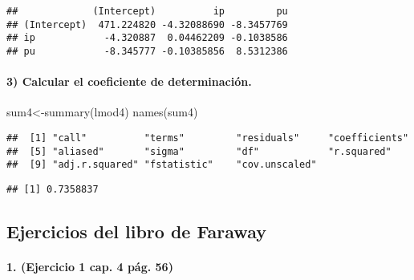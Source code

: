 \documentclass[
]{article}
\newenvironment{Shaded}{\begin{snugshade}}{\end{snugshade}}
\newcommand{\FunctionTok}[1]{\textcolor[rgb]{0.00,0.00,0.00}{#1}}
\newcommand{\NormalTok}[1]{#1}
\newcommand{\OtherTok}[1]{\textcolor[rgb]{0.56,0.35,0.01}{#1}}
\newcommand{\SpecialCharTok}[1]{\textcolor[rgb]{0.00,0.00,0.00}{#1}}
\begin{document}
\begin{verbatim}
##             (Intercept)          ip         pu
## (Intercept)  471.224820 -4.32088690 -8.3457769
## ip            -4.320887  0.04462209 -0.1038586
## pu            -8.345777 -0.10385856  8.5312386
\end{verbatim}

\hypertarget{calcular-el-coeficiente-de-determinaciuxf3n.}{%
\paragraph{3) Calcular el coeficiente de
determinación.}\label{calcular-el-coeficiente-de-determinaciuxf3n.}}

\begin{Shaded}
\begin{Highlighting}[]
\NormalTok{sum4}\OtherTok{\textless{}{-}}\FunctionTok{summary}\NormalTok{(lmod4)}
\FunctionTok{names}\NormalTok{(sum4)}
\end{Highlighting}
\end{Shaded}

\begin{verbatim}
##  [1] "call"          "terms"         "residuals"     "coefficients" 
##  [5] "aliased"       "sigma"         "df"            "r.squared"    
##  [9] "adj.r.squared" "fstatistic"    "cov.unscaled"
\end{verbatim}

\begin{Shaded}
\end{Shaded}

\begin{verbatim}
## [1] 0.7358837
\end{verbatim}

\hypertarget{ejercicios-del-libro-de-faraway}{%
\subsection{Ejercicios del libro de
Faraway}\label{ejercicios-del-libro-de-faraway}}

\hypertarget{ejercicio-1-cap.-4-puxe1g.-56}{%
\paragraph{1. (Ejercicio 1 cap. 4 pág.
56)}\label{ejercicio-1-cap.-4-puxe1g.-56}}
\end{document}
